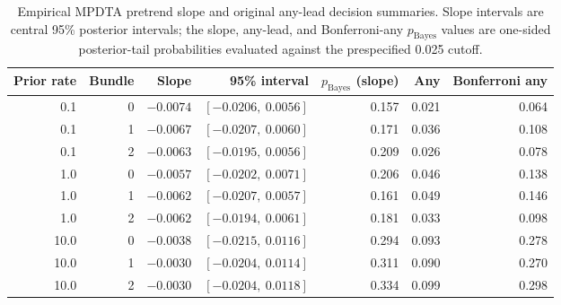 \begin{table}[htbp]
\centering\scriptsize
\caption{Empirical MPDTA pretrend slope and original any-lead decision summaries. Slope intervals are central 95\% posterior intervals; the slope, any-lead, and Bonferroni-any $p_{\mathrm{Bayes}}$ values are one-sided posterior-tail probabilities evaluated against the prespecified 0.025 cutoff.}
\label{tab:application_pretrend}
\begin{tabular}{rrrrrrr}
\toprule
Prior rate & Bundle & Slope & 95\% interval & $p_{\mathrm{Bayes}}$ (slope) & Any & Bonferroni any \\
\midrule
0.1 & 0 & $-0.0074$ & $[-0.0206,\ 0.0056]$ & 0.157 & 0.021 & 0.064 \\
0.1 & 1 & $-0.0067$ & $[-0.0207,\ 0.0060]$ & 0.171 & 0.036 & 0.108 \\
0.1 & 2 & $-0.0063$ & $[-0.0195,\ 0.0056]$ & 0.209 & 0.026 & 0.078 \\
1.0 & 0 & $-0.0057$ & $[-0.0202,\ 0.0071]$ & 0.206 & 0.046 & 0.138 \\
1.0 & 1 & $-0.0062$ & $[-0.0207,\ 0.0057]$ & 0.161 & 0.049 & 0.146 \\
1.0 & 2 & $-0.0062$ & $[-0.0194,\ 0.0061]$ & 0.181 & 0.033 & 0.098 \\
10.0 & 0 & $-0.0038$ & $[-0.0215,\ 0.0116]$ & 0.294 & 0.093 & 0.278 \\
10.0 & 1 & $-0.0030$ & $[-0.0204,\ 0.0114]$ & 0.311 & 0.090 & 0.270 \\
10.0 & 2 & $-0.0030$ & $[-0.0204,\ 0.0118]$ & 0.334 & 0.099 & 0.298 \\
\bottomrule
\end{tabular}
\end{table}
